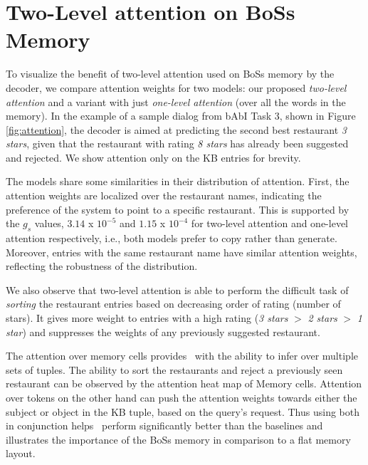 \section{Two-Level attention on BoSs Memory}
\label{ssec:hierarattn}

To visualize the benefit of two-level attention used on {\sc BoSs} memory by the decoder, we compare attention weights for two models: our proposed \emph{two-level attention} and a variant with just \emph{one-level attention} (over all the words in the memory). In the example of a sample dialog from bAbI Task 3, shown in Figure \ref{fig:attention}, the decoder is aimed at predicting the second best restaurant \textit{3 stars}, given that the restaurant with rating \textit{8 stars} has already been suggested and rejected. We show attention only on the KB entries for brevity.

The models share some similarities in their distribution of attention. First, the attention weights are localized over the restaurant names, indicating the preference of the system to point to a specific restaurant. This is supported by the $g_s$ values, $3.14$ x $10^{-5}$ and $1.15$ x $10^{-4}$ for two-level attention and one-level attention respectively, i.e., both models prefer to copy rather than generate. Moreover, entries with the same restaurant name have similar attention weights, reflecting the robustness of the distribution.

We also observe that two-level attention is able to perform the difficult task of {\em sorting} the restaurant entries based on decreasing order of rating (number of stars). It gives more weight to entries with a high rating 
(\textit{3 stars} $>$ \textit{2 stars} $>$ \textit{1 star})
and suppresses the weights of any previously suggested restaurant.

The attention over memory cells provides \sys\ with the ability to infer over multiple sets of tuples. The ability to sort the restaurants and reject a previously seen restaurant can be observed by the attention heat map of Memory cells. Attention over tokens on the other hand can push the attention weights towards either the subject or object in the KB tuple, based on the query's request. Thus using both in conjunction helps \sys\ perform significantly better than the baselines and illustrates the importance of the {\sc BoSs} memory in comparison to a flat memory layout.

